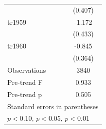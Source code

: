 \begin{table}[htbp]
\begin{tabular}{l*{1}{c}}
                    &     (0.407)         \\
\addlinespace
tr1959              &      -1.172\sym{***}\\
                    &     (0.433)         \\
\addlinespace
tr1960              &      -0.845\sym{**} \\
                    &     (0.364)         \\
\midrule
Observations        &        3840         \\
Pre-trend F         &       0.933         \\
Pre-trend p         &       0.505         \\
\bottomrule
\multicolumn{2}{l}{\footnotesize Standard errors in parentheses}\\
\multicolumn{2}{l}{\footnotesize \sym{*} \(p<0.10\), \sym{**} \(p<0.05\), \sym{***} \(p<0.01\)}\\
\end{tabular}
\end{table}

